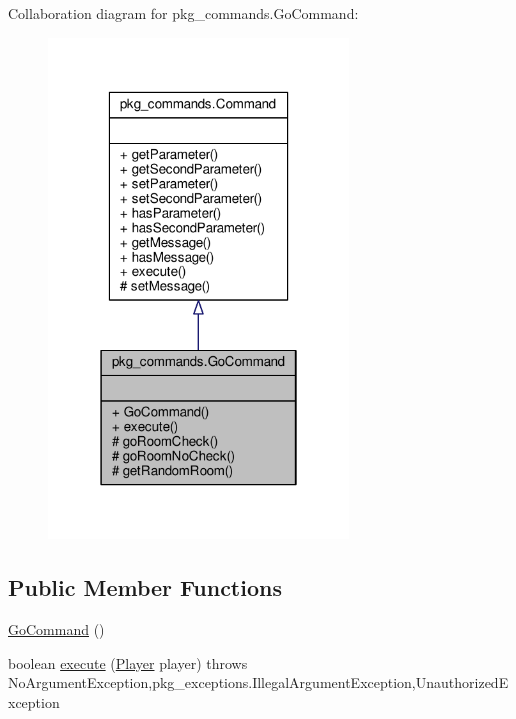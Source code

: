 Collaboration diagram for pkg\-\_\-commands.\-Go\-Command\-:
\nopagebreak
\begin{figure}[H]
\begin{center}
\leavevmode
\includegraphics[width=226pt]{classpkg__commands_1_1GoCommand__coll__graph}
\end{center}
\end{figure}
\subsection*{Public Member Functions}
\begin{DoxyCompactItemize}
\item 
\hyperlink{classpkg__commands_1_1GoCommand_af87b7ac858440df2c3d850c89441f4c7}{Go\-Command} ()
\item 
boolean \hyperlink{classpkg__commands_1_1GoCommand_a82e9a64a0fac612f788060a90c83f9b1}{execute} (\hyperlink{classpkg__world_1_1Player}{Player} player)  throws No\-Argument\-Exception,pkg\-\_\-exceptions.\-Illegal\-Argument\-Exception,\-Unauthorized\-Exception 
\end{DoxyCompactItemize}
